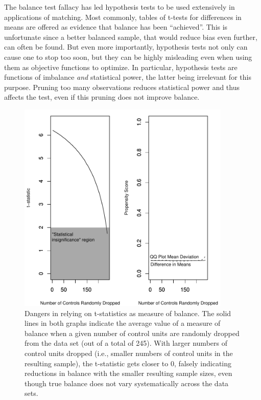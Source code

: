 \documentclass[11pt,titlepage]{article}
\begin{document}
The balance test fallacy has led hypothesis tests to be used
extensively in applications of matching.  Most commonly, tables of
t-tests for differences in means are offered as evidence that balance
has been ``achieved''.  This is unfortunate since a better balanced
sample, that would reduce bias even further, can often be found.  But
even more importantly, hypothesis tests not only can cause one to stop
too soon, but they can be highly misleading even when using them as
objective functions to optimize.  In particular, hypothesis tests are
functions of imbalance \emph{and} statistical power, the latter being
irrelevant for this purpose.  Pruning too many observations reduces
statistical power and thus affects the test, even if this pruning does
not improve balance.

\begin{figure}[t] 
 \begin{center}
   \includegraphics[height=4in]{figs/TStatPlotPscore.pdf}
  \end{center}
  \vspace{-0.275in}
  \caption{Dangers in relying on t-statistics as measure of balance.
    The solid lines in both graphs indicate the average value of a
    measure of balance when a given number of control units are
    randomly dropped from the data set (out of a total of 245).  With
    larger numbers of control units dropped (i.e., smaller numbers of
    control units in the resulting sample), the t-statistic gets
    closer to 0, falsely indicating reductions in balance with the
    smaller resulting sample sizes, even though true balance does not
    vary systematically across the data sets.}
  \label{f:tstat}
\end{figure}
\end{document}
